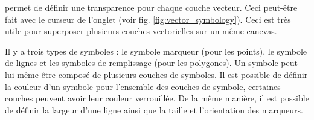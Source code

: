  \label{sec:vect_transparency} 

\qg permet de définir une transparence pour chaque couche vecteur. Ceci peut-être fait avec le curseur  de l'onglet  (voir fig. \ref{fig:vector_symbology}). Ceci est très utile pour superposer plusieurs couches vectorielles sur un même canevas.


Il y a trois types de symboles : le symbole marqueur (pour les points), le symbole de lignes et les symboles de remplissage (pour les polygones). Un symbole peut lui-même être composé de plusieurs couches de symboles. Il est possible de définir la couleur d'un symbole pour l'ensemble des couches de symbole, certaines couches peuvent avoir leur couleur verrouillée. De la même manière, il est possible de définir la largeur d'une ligne ainsi que la taille et l'orientation des marqueurs.


